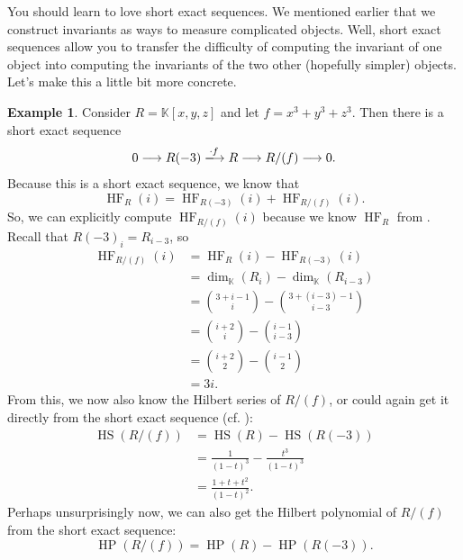 \documentclass[12pt,a4paper]{article}
\newcommand{\KK}{\mathbb{K}}
\DeclareMathOperator{\HF}{HF}
\DeclareMathOperator{\HP}{HP}
\DeclareMathOperator{\HS}{HS}
\theoremstyle{definition}
\newtheorem{example}[theorem]{Example}
\numberwithin{equation}{section}
\begin{document}
You should learn to love short exact sequences.
We mentioned earlier that we construct invariants as ways to measure complicated objects.
Well, short exact sequences allow you to transfer the difficulty of computing the invariant of one object into computing the invariants of the two other (hopefully simpler) objects.
Let's make this a little bit more concrete.

\begin{example}\label{example: ses hilbert function}
    Consider $R = \KK[x,y,z]$ and let $f = x^3 + y^3 + z^3$.
    Then there is a short exact sequence
    \begin{equation*}
        0 \longrightarrow R(-3) \xlongrightarrow[]{\cdot f} R \longrightarrow R / (f) \longrightarrow 0.
    \end{equation*}
    Because this is a short exact sequence, we know that
    \begin{equation*}
        \HF_R(i) = \HF_{R(-3)}(i) + \HF_{R/(f)}(i).
    \end{equation*}
    So, we can explicitly compute $\HF_{R/(f)}(i)$ because we know $\HF_R$ from .
    Recall that $R(-3)_i = R_{i-3}$, so 
    \begin{align*}
        \HF_{R/(f)}(i) &= \HF_R(i) - \HF_{R(-3)}(i) \\
        &= \dim_{\KK}(R_i) - \dim_{\KK}(R_{i-3}) \\
        &= \binom{3+i-1}{i} - \binom{3+(i-3)-1}{i-3} \\
        &= \binom{i+2}{i} - \binom{i-1}{i-3} \\
        &= \binom{i+2}{2} - \binom{i-1}{2} \\
        &= 3i.
    \end{align*}
    From this, we now also know the Hilbert series of $R/(f)$, or could again get it directly from the short exact sequence (cf. ):
    \begin{align*}
        \HS(R/(f)) &= \HS(R) - \HS(R(-3)) \\
        &= \frac{1}{(1-t)^3} - \frac{t^3}{(1-t)^3} \\
        &= \frac{1 + t + t^2}{(1-t)^2}.
    \end{align*}
    Perhaps unsurprisingly now, we can also get the Hilbert polynomial of $R/(f)$ from the short exact sequence:
    \begin{equation*}
        \HP(R/(f)) = \HP(R) - \HP(R(-3)).
    \end{equation*}
\end{example}
\end{document}
